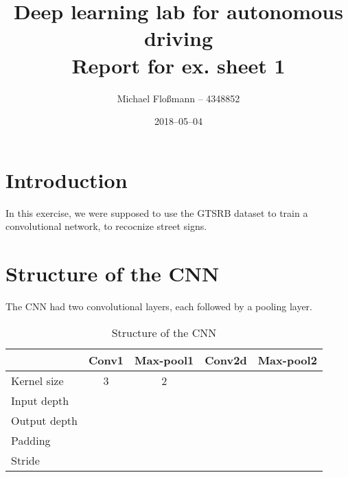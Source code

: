\documentclass[12pt, a4paper]{scrartcl}
\title{Deep learning lab for autonomous driving \\ Report for ex. sheet 1}
\author{Michael Floßmann -- 4348852}
\date{2018--05--04}
\begin{document}
\maketitle
\section{Introduction}
In this exercise, we were supposed to use the GTSRB dataset to train a
convolutional network, to recocnize street signs.

\section{Structure of the CNN}
The CNN had two convolutional layers, each followed by a pooling layer.
\begin{table}[!htbp]
  \centering
  \begin{tabular}{lcccc}
    &Conv1&Max-pool1&Conv2d&Max-pool2\\ \hline
    Kernel size & 3 & 2 & \\
    Input depth & \\
    Output depth & \\
    Padding & \\
    Stride & \\
  \end{tabular}
  \caption{Structure of the CNN}
\end{table}
\end{document}
